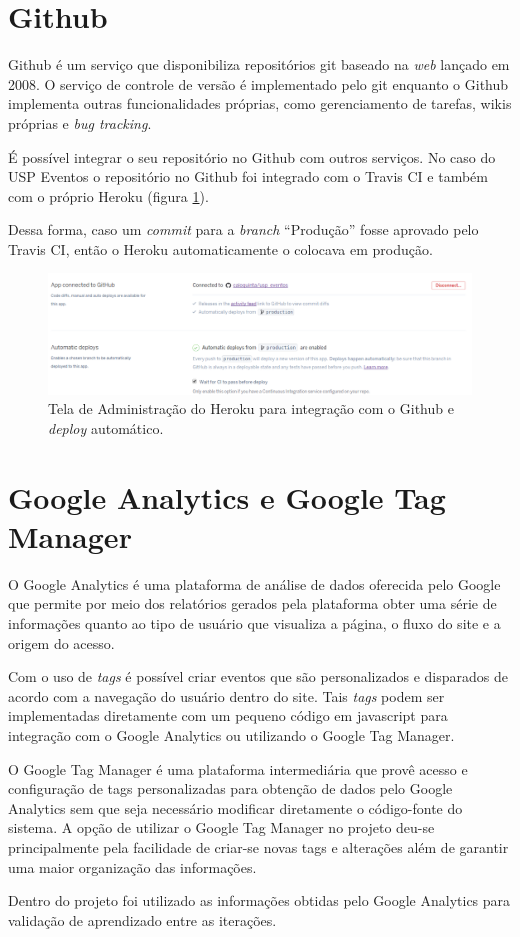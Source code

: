 \section{Github}
\par Github é um serviço que disponibiliza repositórios git baseado na \emph{web} lançado em 2008. O serviço de controle de versão é implementado pelo git enquanto o Github implementa outras funcionalidades próprias, como gerenciamento de tarefas, wikis próprias e \emph{bug tracking}.
\par É possível integrar o seu repositório no Github com outros serviços. No caso do USP Eventos o repositório no Github foi integrado com o Travis CI e também com o próprio Heroku (figura \ref{fig:heroku_automatic_deploy}).
\par Dessa forma, caso um \emph{commit} para a \emph{branch} ``Produção'' fosse aprovado pelo Travis CI, então o Heroku automaticamente o colocava em produção.
\begin{figure}[htb]
\centering
\includegraphics[width=15cm]{figuras/heroku_automatic_deploy}
\caption{\label{fig:heroku_automatic_deploy} Tela de Administração do Heroku para integração com o Github e \emph{deploy} automático.}
\end{figure}
\section{Google Analytics e Google Tag Manager}
\par O Google Analytics é uma plataforma de análise de dados oferecida pelo Google que permite por meio dos relatórios gerados pela plataforma obter uma série de informações quanto ao tipo de usuário que visualiza a página, o fluxo do site e a origem do acesso.
\par Com o uso de \emph{tags} é possível criar eventos que são personalizados e disparados de acordo com a navegação do usuário dentro do site. Tais \emph{tags} podem ser implementadas diretamente com um pequeno código em javascript para integração com o Google Analytics ou utilizando o Google Tag Manager.
\par O Google Tag Manager é uma plataforma intermediária que provê acesso e configuração de tags personalizadas para obtenção de dados pelo Google Analytics sem que seja necessário modificar diretamente o código-fonte do sistema. A opção de utilizar o Google Tag Manager no projeto deu-se principalmente pela facilidade de criar-se novas tags e alterações além de garantir uma maior organização das informações.
\par Dentro do projeto foi utilizado as informações obtidas pelo Google Analytics para validação de aprendizado entre as iterações.

